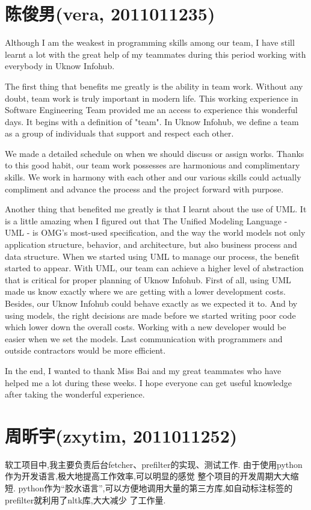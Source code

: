 \section{陈俊男(vera, 2011011235)}
  Although I am the weakest in programming skills among our team,
  I have still learnt a lot with the great help of my teammates during this period working with everybody in Uknow Infohub.

  The first thing that benefits me greatly is the ability in team work.
  Without any doubt, team work is truly important in modern life.
  This working experience in Software Engineering Team provided me an access to experience this wonderful days.
  It begins with a definition of "team".
  In Uknow Infohub, we define a team as a group of individuals that support and respect each other.

  We made a detailed schedule on when we should discuss or assign works.
  Thanks to this good habit, our team work possesses are harmonious and complimentary skills.
  We work in harmony with each other and our various skills could actually compliment and advance the process and the project forward with purpose.

  Another thing that benefited me greatly is that I learnt about the use of UML.
  It is a little amazing when I figured out that The Unified Modeling Language - UML - is OMG's most-used specification,
  and the way the world models not only application structure, behavior, and architecture,
  but also business process and data structure.
  When we started using UML to manage our process, the benefit started to appear.
  With UML, our team can achieve a higher level of abstraction that is critical for proper planning of Uknow Infohub.
  First of all, using UML made us know exactly where we are getting with a lower development costs.
  Besides, our Uknow Infohub could behave exactly as we expected it to.
  And by using models, the right decisions are made before we started writing poor code which lower down the overall costs.
  Working with a new developer would be easier when we set the models.
  Last communication with programmers and outside contractors would be more efficient.

  In the end, I wanted to thank Miss Bai and my great teammates who have helped me a lot during these weeks.
  I hope everyone can get useful knowledge after taking the wonderful experience.

\section{周昕宇(zxytim, 2011011252)}
  软工项目中,我主要负责后台fetcher、prefilter的实现、测试工作.
  由于使用python作为开发语言,极大地提高工作效率,可以明显的感觉 整个项目的开发周期大大缩短.
  python作为“胶水语言”,可以方便地调用大量的第三方库,如自动标注标签的prefilter就利用了nltk库,大大减少 了工作量.

